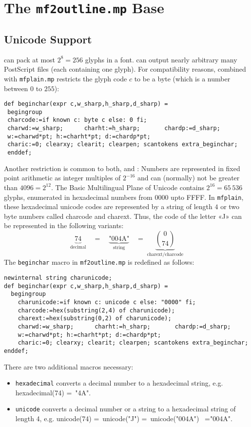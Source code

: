 \documentclass{scrartcl}
\begin{document}
\section{The \texttt{mf2outline.mp} Base}
%
\subsection{Unicode Support}
%
\MF{} can pack at most $2^{8}=256$ glyphs in a font. \MP{} can output nearly arbitrary many PostScript files (each containing one glyph). For compatibility reasons, \MP{} combined with \texttt{mfplain.mp} restricts the glyph code $c$ to be a byte (which is a number between $0$ to $255$):
\lstset{language=MetaPost,columns=fullflexible}
\begin{lstlisting}
def beginchar(expr c,w_sharp,h_sharp,d_sharp) =
 begingroup
 charcode:=if known c: byte c else: 0 fi;
 charwd:=w_sharp;      charht:=h_sharp;       chardp:=d_sharp;
 w:=charwd*pt; h:=charht*pt; d:=chardp*pt;
 charic:=0; clearxy; clearit; clearpen; scantokens extra_beginchar;
 enddef;
\end{lstlisting}
%
Another restriction is common to both, \MF{} and \MP: Numbers are represented in fixed point arithmetic as integer multiples of $2^{-16}$ and can (normally) not be greater than $4096=2^{12}$. The Basic Multilingual Plane of Unicode contains $2^{16}=65\,536$ glyphs, enumerated in hexadecimal numbers from 0000 upto FFFF. In \texttt{mfplain}, these  hexadecimal unicode codes are represented by a string of length $4$ or two byte numbers called charcode and charext. Thus, the code of the letter «J» can be represented in the following variants:
\[
	\underbrace{74}_{\text{decimal}}\quad=\quad\underbrace{\text{"004A"}}_{\text{string}}\quad=\;\underbrace{\binom{0}{74}}_{\text{charext/charcode}}
\]
The \texttt{beginchar} macro in \texttt{mf2outline.mp} is redefined as follows:
\lstset{language=MetaPost,columns=fullflexible}
\begin{lstlisting}
newinternal string charunicode;
def beginchar(expr c,w_sharp,h_sharp,d_sharp) =
  begingroup
    charunicode:=if known c: unicode c else: "0000" fi; 
    charcode:=hex(substring(2,4) of charunicode); 
    charext:=hex(substring(0,2) of charunicode); 
    charwd:=w_sharp;      charht:=h_sharp;       chardp:=d_sharp;
    w:=charwd*pt; h:=charht*pt; d:=chardp*pt;
    charic:=0; clearxy; clearit; clearpen; scantokens extra_beginchar;
enddef;
\end{lstlisting}
%
There are two additional macros necessary:
\begin{itemize}
	\item \texttt{hexadecimal} converts a decimal number to a hexadecimal string, e.g. hexadecimal(74) =~"4A".
	\item \texttt{unicode} converts a decimal number or a string to a hexadecimal string of length 4, e.g. unicode(74) =~unicode("J") =~unicode("004A") ~="004A".
\end{itemize}
\end{document}
